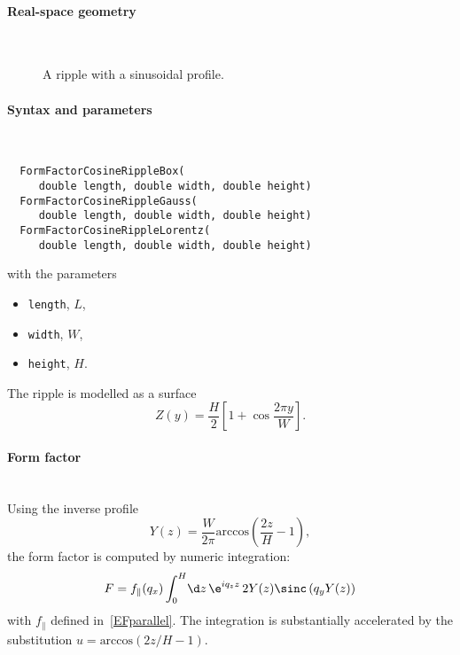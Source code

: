 \paragraph{Real-space geometry}\strut\\

\begin{figure}[H]
\hfill
{}
\hfill
{}
\hfill
{}
\hfill
\caption{A ripple with a sinusoidal profile.}
\end{figure}

\paragraph{Syntax and parameters}\strut\\[-2ex plus .2ex minus .2ex]
\begin{lstlisting}
  FormFactorCosineRippleBox(
     double length, double width, double height)
  FormFactorCosineRippleGauss(
     double length, double width, double height)
  FormFactorCosineRippleLorentz(
     double length, double width, double height)
\end{lstlisting}
with the parameters
\begin{itemize}
\item \texttt{length}, $L$,
\item \texttt{width}, $W$,
\item \texttt{height}, $H$.
\end{itemize}
The ripple is modelled as a surface
\begin{equation*}
  Z(y) = \frac{H}{2}\left[ 1 + \cos\frac{2\pi y}{W} \right].
\end{equation*}

\paragraph{Form factor}\strut\\
Using the inverse profile
\begin{equation*}
  Y(z) = \frac{W}{2\pi}\text{arccos}\left( \frac{2z}{H}-1 \right),
\end{equation*}
the form factor is computed by numeric integration:
\begin{equation*}
F = f_\parallel(q_x)
   \int_0^H\!\d z\,\e^{iq_zz}\, 2Y(z)\sinc\left(q_y Y(z)\right)
\end{equation*}
with $f_\parallel$ defined in~\cref{EFparallel}.
The integration is substantially accelerated by the substitution
$u=\text{arccos}( 2z/H-1)$.

